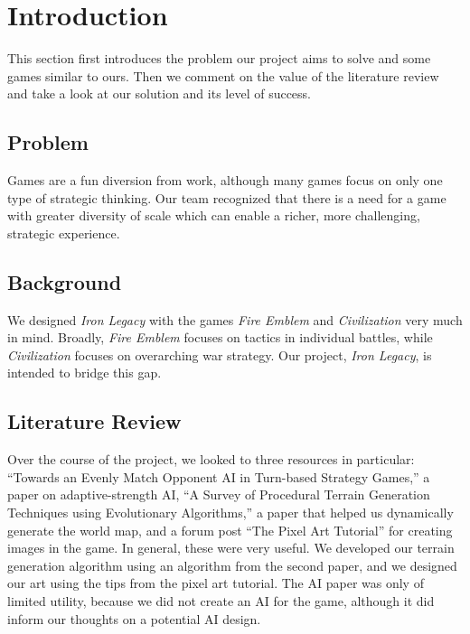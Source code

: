 \documentclass{article}
\begin{document}
\clearpage

\section*{Introduction}
This section first introduces the problem our project aims to solve and some
games similar to ours.
Then we comment on the value of the literature review and take a look at our
solution and its level of success.

\subsection*{Problem}
Games are a fun diversion from work, although many games focus on only one type
of strategic thinking. Our team recognized that there is a need for a game with
greater diversity of scale which can enable a richer, more challenging,
strategic experience.

\subsection*{Background}
We designed \emph{Iron Legacy} with the games 
\emph{Fire Emblem}\cite{FireEmblem} and \emph{Civilization}\cite{Civilization} 
very much in mind.
Broadly, \emph{Fire Emblem} focuses on tactics in individual battles, while
\emph{Civilization} focuses on overarching war strategy.
Our project, \emph{Iron Legacy}, is intended to bridge this gap.

\subsection*{Literature Review}
Over the course of the project, we looked to three resources in particular:
``Towards an Evenly Match Opponent AI in Turn-based Strategy Games,''\cite{AI} 
a paper on adaptive-strength AI, 
``A Survey of Procedural Terrain Generation Techniques using Evolutionary 
Algorithms,''\cite{Terrain Generation} a paper that helped us dynamically
generate the world map, and a forum post ``The Pixel Art 
Tutorial''\cite{Pixel Art} for creating images in the game.
In general, these were very useful.
We developed our terrain generation algorithm using an algorithm from the 
second paper, and we designed our art using the tips from the pixel art
tutorial.
The AI paper was only of limited utility, because we did not create an AI for
the game, although it did inform our thoughts on a potential AI design.
\end{document}
